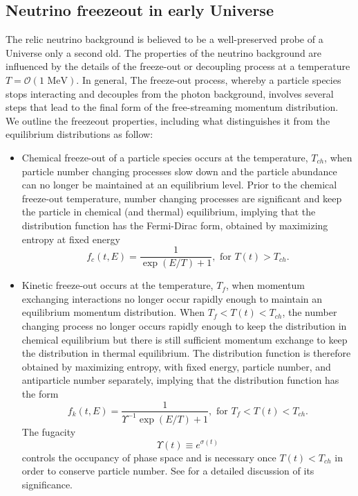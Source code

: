 \documentclass[universe,article,submit,moreauthors,pdftex,a4paper]{Definitions/mdpi}
\newcommand{\MeV}{\text{ MeV}}
\begin{document}
\subsection{Neutrino freezeout in early Universe}\label{sec:Freezeout}
\noindent The relic neutrino background is believed to be a  well-preserved probe of a Universe only a second old. The properties of the neutrino background are influenced by the details of the freeze-out or decoupling process at a temperature $T=\mathcal{O}(1\MeV)$. In general, The freeze-out process, whereby a particle species stops interacting and decouples from the photon background, involves several steps that lead to the final form of the free-streaming momentum distribution. We outline the freezeout properties, including what distinguishes it from the equilibrium distributions as follow\cite{Birrell:2012gg}:
\begin{itemize}
  \item
Chemical freeze-out of a particle species occurs at the temperature, 
$T_{ch}$, when particle number changing processes slow down and the particle abundance can no longer be maintained at an equilibrium level. Prior to the  chemical freeze-out temperature,  number changing processes are significant and keep the particle in chemical (and thermal) equilibrium, implying that the distribution function has the Fermi-Dirac form, obtained by maximizing entropy at fixed energy
\begin{equation}\label{equilibrium}
f_{c}(t,E)=\frac{1}{\exp(E/T)+1}, \text{ for } T(t)> T_{ch}.
\end{equation}

\item
Kinetic freeze-out occurs at the temperature, $T_f$, when momentum exchanging interactions no longer occur rapidly enough to maintain an equilibrium momentum distribution. When $T_f<T(t)<T_{ch}$, the number changing process  no longer occurs rapidly enough to keep the distribution in chemical equilibrium but there is still sufficient momentum exchange to keep the distribution in thermal equilibrium.  The distribution function is therefore obtained by maximizing entropy, with fixed energy, particle number, and antiparticle number separately,  implying that the distribution function has the form
\begin{equation}\label{kinetic_equilib}
f_k(t,E)=\frac{1}{\Upsilon^{-1}\exp(E/T)+1}, \text{ for }T_f< T(t)< T_{ch}.
\end{equation}
The fugacity
\begin{equation}
\Upsilon(t)\equiv e^{\sigma(t)}
\end{equation}
 controls the occupancy of phase space and is necessary once $T(t)<T_{ch}$ in order to conserve particle number. See \cite{Birrell:2012gg} for a detailed discussion of its significance.
 

\end{itemize}
\end{document}

